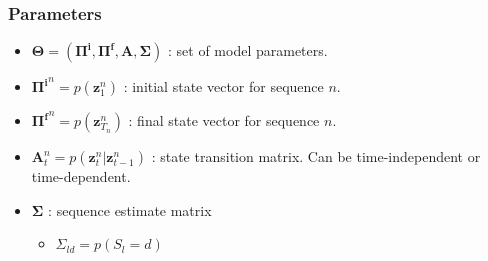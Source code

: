 \documentclass[10pt]{article}
\begin{document}
\subsubsection{Parameters}
\begin{itemize}
\item $\mathbf{\Theta} = (\mathbf{\Pi^i},\mathbf{\Pi^f},\mathbf{A},\mathbf{\Sigma})$ : set of model parameters.
\item $\mathbf{\Pi^i}^n = p(\mathbf{z}_1^n)$ : initial state vector for sequence $n$.
\item $\mathbf{\Pi^f}^n = p(\mathbf{z}_{T_n}^n)$ : final state vector for sequence $n$.
\item $\mathbf{A}_t^n = p(\mathbf{z}_{t}^n|\mathbf{z}_{t-1}^n)$ : state transition matrix. Can be time-independent or time-dependent.
\item $\mathbf{\Sigma}$ : sequence estimate matrix
\begin{itemize}
\item $\Sigma_{ld} = p(S_l=d)$
\end{itemize}
\end{itemize}
\end{document}
